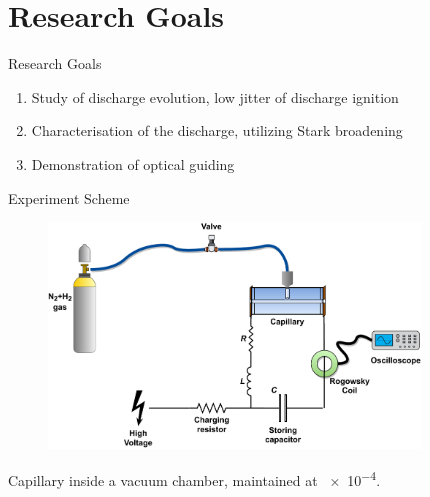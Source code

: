 \documentclass[dvipsnames]{beamer}
\begin{document}


\section{Research Goals}
\begin{frame}{Research Goals}
 \begin{enumerate}
\item Study of discharge evolution, low jitter of discharge ignition
\item Characterisation of the discharge, utilizing Stark broadening
\item Demonstration of optical guiding
 \end{enumerate}
\end{frame}
\begin{frame}{Experiment Scheme}
\begin{figure}
 \includegraphics[height=170pt]{figures/results/jitter/discharge_scheme.pdf}
\end{figure}
Capillary inside a vacuum chamber, maintained at \SI{e-4}{\torr}.
\end{frame}
\end{document}
